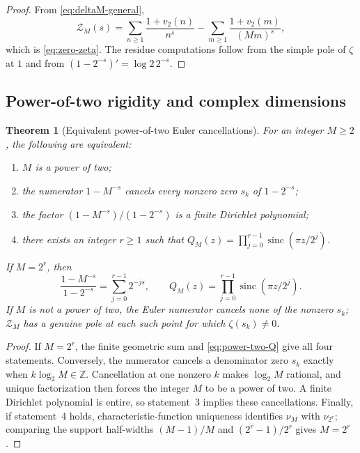 \documentclass[11pt,oneside]{article}
\newtheorem{theorem}{Theorem}[section]
\theoremstyle{definition}
\theoremstyle{remark}
\newcommand{\Z}{\mathbb Z}
\newcommand{\sinc}{\operatorname{sinc}}
\newcommand{\vtwo}{v_2}
\numberwithin{equation}{section}
\newcommand{\1}{\mathbf 1}
\begin{document}
\begin{proof}
From \eqref{eq:deltaM-general},
\[
 \mathcal Z_M(s)
 =\sum_{n\ge1}\frac{1+\vtwo(n)}{n^s}
 -\sum_{m\ge1}\frac{1+\vtwo(m)}{(Mm)^s},
\]
which is \eqref{eq:zero-zeta}.  The residue computations follow from the simple pole of
$\zeta$ at $1$ and from
$(1-2^{-s})'=\log2\,2^{-s}$.
\end{proof}

\subsection{Power-of-two rigidity and complex dimensions}

\begin{theorem}[Equivalent power-of-two Euler cancellations]
\label{thm:power-two-poles}
For an integer $M\ge2$, the following are equivalent:
\begin{enumerate}
\item $M$ is a power of two;
\item the numerator $1-M^{-s}$ cancels every nonzero zero $s_k$ of $1-2^{-s}$;
\item the factor $(1-M^{-s})/(1-2^{-s})$ is a finite Dirichlet polynomial;
\item there exists an integer $r\ge1$ such that
$Q_M(z)=\prod_{j=0}^{r-1}\sinc(\pi z/2^j)$.
\end{enumerate}
If $M=2^r$, then
\begin{equation}
 \frac{1-M^{-s}}{1-2^{-s}}=\sum_{j=0}^{r-1}2^{-js},
 \qquad
 Q_M(z)=\prod_{j=0}^{r-1}\sinc(\pi z/2^j).
 \label{eq:power-two-equivalences}
\end{equation}
If $M$ is not a power of two, the Euler numerator cancels none of the nonzero $s_k$;
$\mathcal Z_M$ has a genuine pole at each such point for which $\zeta(s_k)\ne0$.
\end{theorem}

\begin{proof}
If $M=2^r$, the finite geometric sum and \eqref{eq:power-two-Q} give all four
statements.  Conversely, the numerator cancels a denominator zero $s_k$ exactly when
$k\log_2M\in\Z$.  Cancellation at one nonzero $k$ makes $\log_2M$ rational, and
unique factorization then forces the integer $M$ to be a power of two.  A finite Dirichlet
polynomial is entire, so statement~3 implies these cancellations.  Finally, if statement~4
holds, characteristic-function uniqueness identifies $\nu_M$ with $\nu_{2^r}$; comparing
the support half-widths $(M-1)/M$ and $(2^r-1)/2^r$ gives $M=2^r$.
\end{proof}
\end{document}
